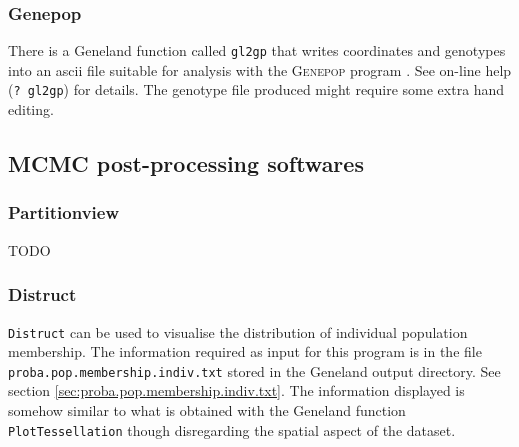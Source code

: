 \documentclass[a4paper,10pt]{article}
\begin{document}
\subsubsection{Genepop}
There is a {\sc Geneland} function called \texttt{gl2gp} that writes coordinates and genotypes into an ascii file suitable for analysis 
with the \textsc{Genepop} program \citep{Rousset07}. See on-line help (\texttt{? gl2gp}) for details. 
The genotype file produced might require some extra hand editing.

\subsection{MCMC post-processing  softwares}
\subsubsection{Partitionview}

TODO

\subsubsection{Distruct}
\texttt{Distruct} can be used to visualise the distribution of individual population membership. 
The information required as input for this program is in the file \texttt{proba.pop.membership.indiv.txt} stored in the {\sc Geneland} output directory. 
See section \ref{sec:proba.pop.membership.indiv.txt}. 
The information displayed is somehow similar to what is obtained with the {\sc Geneland} function \texttt{PlotTessellation} 
though disregarding the spatial aspect of the dataset. 




\end{document}
